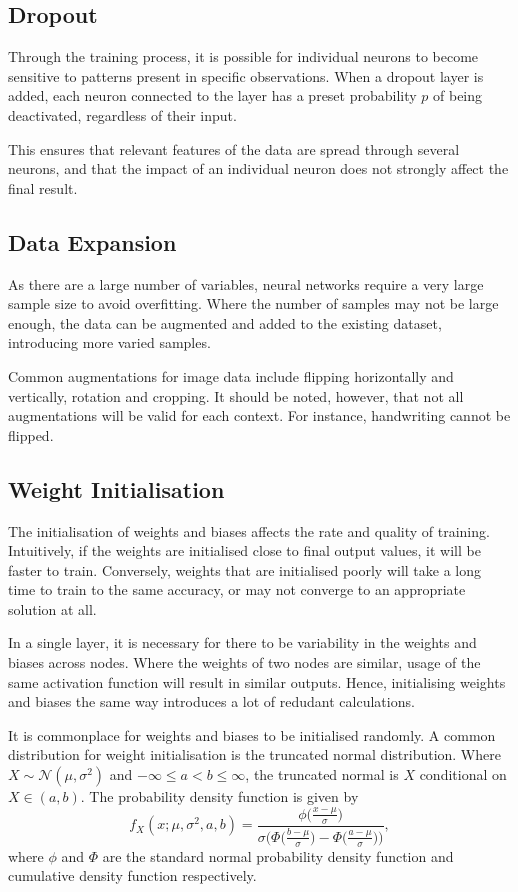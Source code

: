 \subsection{Dropout}\label{nnet-dropout}

Through the training process, it is possible for individual neurons to become sensitive to patterns present in specific observations. When a dropout layer is added, each neuron connected to the layer has a preset probability $p$ of being deactivated, regardless of their input.

This ensures that relevant features of the data are spread through several neurons, and that the impact of an individual neuron does not strongly affect the final result.

\subsection{Data Expansion}

As there are a large number of variables, neural networks require a very large sample size to avoid overfitting. Where the number of samples may not be large enough, the data can be augmented and added to the existing dataset, introducing more varied samples.

Common augmentations for image data include flipping horizontally and vertically, rotation and cropping. It should be noted, however, that not all augmentations will be valid for each context. For instance, handwriting cannot be flipped. 

\subsection{Weight Initialisation}

The initialisation of weights and biases affects the rate and quality of training. Intuitively, if the weights are initialised close to final output values, it will be faster to train. Conversely, weights that are initialised poorly will take a long time to train to the same accuracy, or may not converge to an appropriate solution at all.

In a single layer, it is necessary for there to be variability in the weights and biases across nodes. Where the weights of two nodes are similar, usage of the same activation function will result in similar outputs. Hence, initialising weights and biases the same way introduces a lot of redudant calculations.

It is commonplace for weights and biases to be initialised randomly. A common distribution for weight initialisation is the truncated normal distribution. Where $X\sim\mathcal{N}(\mu,\sigma^2)$ and $-\infty \le a < b \le \infty$, the truncated normal is $X$ conditional on $X\in(a,b)$. The probability density function is given by
\[
	f_X(x;\mu, \sigma^2,a,b) = \dfrac{\phi\big(\frac{x-\mu}{\sigma}\big)}{\sigma\bigg(\Phi\big(\frac{b-\mu}{\sigma}\big) - \Phi\big(\frac{a-\mu}{\sigma}\big)\bigg)},
\]
where $\phi$ and $\Phi$ are the standard normal probability density function and cumulative density function respectively.

